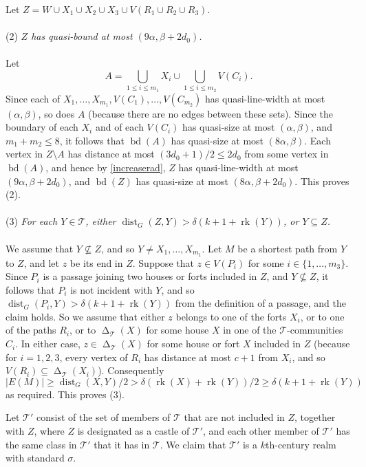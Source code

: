 \documentclass[titlepage,11pt]{article}
\def\LL{,\ldots,}
\newcommand{\dist}{\operatorname{dist}}
\newcommand{\voro}{\operatorname{\Delta}}
\newcommand{\rk}{\operatorname{rk}}
\newcommand{\bd}{\operatorname{bd}}
\newcommand{\mac}{\mathcal}
\begin{document}
	Let $Z=W\cup X_1\cup X_2\cup X_3\cup V(R_1\cup R_2\cup R_3)$.
	\\
	\\
	(2) {\em $Z$ has quasi-bound at most $(9\alpha,\beta+2d_0)$.}
	\\
	\\
	Let 
	$$A=\bigcup_{1\le i\le m_1} X_i \cup \bigcup_{1\le i\le m_2}V(C_i).$$
	Since each of
	$X_1\LL X_{m_1}, V(C_1)\LL V(C_{m_2})$
	has quasi-line-width at most $(\alpha,\beta)$, so does $A$ (because there are no edges between these sets).
	Since the boundary of each $X_i$ and of each $V(C_i)$ has quasi-size at most $(\alpha, \beta)$, and $m_1+m_2\le 8$, it follows that $\bd(A)$ 
	has quasi-size at most 
	$(8\alpha, \beta)$. Each vertex in $Z\setminus A$ has distance at most $(3d_0+1)/2\le 2d_0$ from some vertex in $\bd(A)$, and hence by \ref{increaserad}, 
	$Z$ has quasi-line-width at most $(9\alpha, \beta+2d_0)$, and $\bd(Z)$ has quasi-size at most $(8\alpha, \beta+2d_0)$. This proves (2).
	\\
	\\
	(3) {\em For each $Y\in \mathcal{T}$, either $\dist_G(Z,Y)> \delta(k+1+\rk(Y))$, or $Y\subseteq Z$.}
	\\
	\\
	We assume that $Y\not\subseteq Z$, and so $Y\ne X_1\LL X_{m_1}$. Let $M$ be a shortest path from $Y$ to $Z$, and let $z$ be its end in $Z$.
	Suppose that $z\in V(P_i)$ for some $i\in \{1\LL m_3\}$. Since $P_i$ is a passage joining two houses or forts included in $Z$, and 
	$Y\not\subseteq Z$, it follows that $P_i$ is not incident with $Y$, and so $\dist_G(P_i,Y)>  \delta(k+1+\rk(Y))$ from the definition of a passage, and the claim holds. 
	So we assume that either $z$ belongs to one of the forts
	$X_i$, or to one of the paths $R_i$, or to $\voro_{\mac T}(X)$ for some house $X$ in one of the $\mac T$-communities $C_i$. 
	In either case, $z\in \voro_{\mac T}(X)$ for some 
	house or fort $X$ included in $Z$ (because for $i = 1,2,3$, every vertex of $R_i$ has distance at most $c+1$ from $X_i$, and so
	$V(R_i)\subseteq  \voro_{\mac T}(X_i)$).
	Consequently 
	$$|E(M)|\ge \dist_G(X,Y)/2>\delta(\rk(X)+\rk(Y))/2\ge \delta(k+1+\rk(Y))$$
	as required. This proves (3).
	
	\bigskip
	
	Let
	$\mathcal{T}'$ consist of the set of members of $\mac T$ that are not included in $Z$, together with $Z$, where $Z$ is designated as a castle of $\mac T'$, and each other member
	of $\mac T'$ has the same class in $\mac T'$ that it has in $\mac T$.
	We claim that
	$\mac T'$ is a $k$th-century realm with standard $\sigma$.
	
\end{document}

